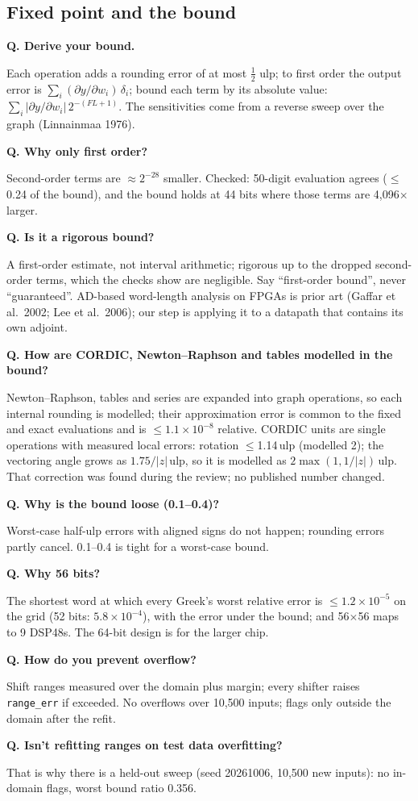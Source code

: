 \documentclass[11pt,a4paper]{article}
\newcounter{qn}
\newcommand{\qa}[2]{\stepcounter{qn}\par\medskip\noindent\textbf{Q\theqn. #1}\par\noindent #2\par}
\begin{document}
\subsection{Fixed point and the bound}
\qa{Derive your bound.}{Each operation adds a rounding error of at most $\tfrac12$ ulp; to first order the output error is $\sum_i (\partial y/\partial w_i)\,\delta_i$; bound each term by its absolute value: $\sum_i |\partial y/\partial w_i|\,2^{-(FL+1)}$. The sensitivities come from a reverse sweep over the graph (Linnainmaa 1976).}
\qa{Why only first order?}{Second-order terms are $\approx2^{-28}$ smaller. Checked: 50-digit evaluation agrees ($\le$ 0.24 of the bound), and the bound holds at 44 bits where those terms are 4,096$\times$ larger.}
\qa{Is it a rigorous bound?}{A first-order estimate, not interval arithmetic; rigorous up to the dropped second-order terms, which the checks show are negligible. Say ``first-order bound'', never ``guaranteed''. AD-based word-length analysis on FPGAs is prior art (Gaffar et al.\ 2002; Lee et al.\ 2006); our step is applying it to a datapath that contains its own adjoint.}
\qa{How are CORDIC, Newton--Raphson and tables modelled in the bound?}{Newton--Raphson, tables and series are expanded into graph operations, so each internal rounding is modelled; their approximation error is common to the fixed and exact evaluations and is $\le1.1\times10^{-8}$ relative. CORDIC units are single operations with measured local errors: rotation $\le$1.14\,ulp (modelled 2); the vectoring angle grows as $1.75/|z|$\,ulp, so it is modelled as $2\max(1,1/|z|)$\,ulp. That correction was found during the review; no published number changed.}
\qa{Why is the bound loose (0.1--0.4)?}{Worst-case half-ulp errors with aligned signs do not happen; rounding errors partly cancel. 0.1--0.4 is tight for a worst-case bound.}
\qa{Why 56 bits?}{The shortest word at which every Greek's worst relative error is $\le1.2\times10^{-5}$ on the grid (52 bits: $5.8\times10^{-4}$), with the error under the bound; and 56$\times$56 maps to 9 DSP48s. The 64-bit design is for the larger chip.}
\qa{How do you prevent overflow?}{Shift ranges measured over the domain plus margin; every shifter raises \texttt{range\_err} if exceeded. No overflows over 10,500 inputs; flags only outside the domain after the refit.}
\qa{Isn't refitting ranges on test data overfitting?}{That is why there is a held-out sweep (seed 20261006, 10,500 new inputs): no in-domain flags, worst bound ratio 0.356.}
\end{document}
